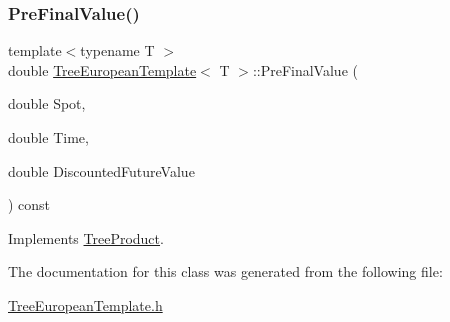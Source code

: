 \hypertarget{classTreeEuropeanTemplate_a09419e2ce4ef3564661a45440ed24882}{}\label{classTreeEuropeanTemplate_a09419e2ce4ef3564661a45440ed24882} 
\subsubsection{\texorpdfstring{Pre\+Final\+Value()}{PreFinalValue()}}
{\footnotesize\ttfamily template$<$typename T $>$ \\
double \hyperlink{classTreeEuropeanTemplate}{Tree\+European\+Template}$<$ T $>$\+::Pre\+Final\+Value (\begin{DoxyParamCaption}\item[{double}]{Spot,  }\item[{double}]{Time,  }\item[{double}]{Discounted\+Future\+Value }\end{DoxyParamCaption}) const\hspace{0.3cm}{\ttfamily [virtual]}}



Implements \hyperlink{classTreeProduct_a0b58b8acdd3759f55212c1c65361056e}{Tree\+Product}.



The documentation for this class was generated from the following file\+:\begin{DoxyCompactItemize}
\item 
\hyperlink{TreeEuropeanTemplate_8h}{Tree\+European\+Template.\+h}\end{DoxyCompactItemize}
